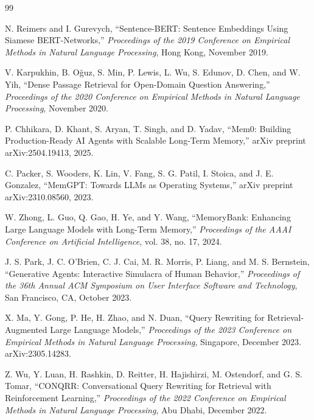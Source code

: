 \documentclass[12pt,letterpaper,oneside]{report}
\begin{document}
\begingroup
\singlespacing
\renewcommand{\bibname}{\normalfont\bfseries\large References}
\begin{thebibliography}{99}
\setlength{\itemsep}{9pt}\setlength{\parsep}{0pt}

 N. Reimers and I. Gurevych, ``Sentence-BERT:
Sentence Embeddings Using Siamese BERT-Networks,'' \emph{Proceedings of the
2019 Conference on Empirical Methods in Natural Language Processing}, Hong
Kong, November 2019.

 V. Karpukhin, B. O\u{g}uz, S. Min, P. Lewis, L. Wu,
S. Edunov, D. Chen, and W. Yih, ``Dense Passage Retrieval for Open-Domain
Question Answering,'' \emph{Proceedings of the 2020 Conference on Empirical
Methods in Natural Language Processing}, November 2020.

 P. Chhikara, D. Khant, S. Aryan, T. Singh, and
D. Yadav, ``Mem0: Building Production-Ready AI Agents with Scalable Long-Term
Memory,'' arXiv preprint arXiv:2504.19413, 2025.

 C. Packer, S. Wooders, K. Lin, V. Fang,
S. G. Patil, I. Stoica, and J. E. Gonzalez, ``MemGPT: Towards LLMs as Operating
Systems,'' arXiv preprint arXiv:2310.08560, 2023.

 W. Zhong, L. Guo, Q. Gao, H. Ye, and
Y. Wang, ``MemoryBank: Enhancing Large Language Models with Long-Term Memory,''
\emph{Proceedings of the AAAI Conference on Artificial Intelligence}, vol. 38,
no. 17, 2024.

 J. S. Park, J. C. O'Brien, C. J. Cai,
M. R. Morris, P. Liang, and M. S. Bernstein, ``Generative Agents: Interactive
Simulacra of Human Behavior,'' \emph{Proceedings of the 36th Annual ACM
Symposium on User Interface Software and Technology}, San Francisco, CA,
October 2023.

 X. Ma, Y. Gong, P. He, H. Zhao, and N. Duan,
``Query Rewriting for Retrieval-Augmented Large Language Models,''
\emph{Proceedings of the 2023 Conference on Empirical Methods in Natural
Language Processing}, Singapore, December 2023. arXiv:2305.14283.

 Z. Wu, Y. Luan, H. Rashkin, D. Reitter,
H. Hajishirzi, M. Ostendorf, and G. S. Tomar, ``CONQRR: Conversational Query
Rewriting for Retrieval with Reinforcement Learning,'' \emph{Proceedings of the
2022 Conference on Empirical Methods in Natural Language Processing}, Abu
Dhabi, December 2022.


\end{thebibliography}
\end{document}
